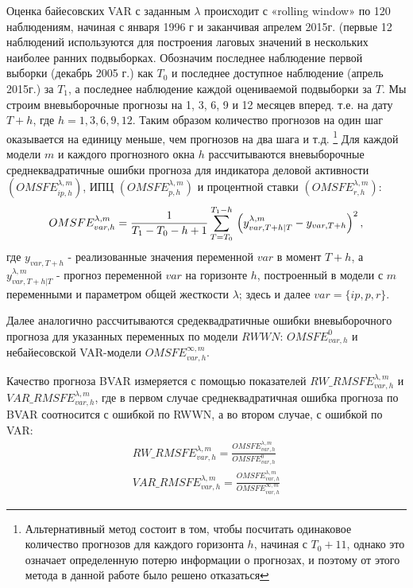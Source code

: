 \documentclass[11pt]{article} %
\begin{document}
	Оценка байесовских VAR с заданным $\lambda$ происходит с «rolling window» по 120 наблюдениям, начиная с января 1996 г и заканчивая апрелем 2015г. (первые 12 наблюдений используются для построения лаговых значений в нескольких наиболее ранних подвыборках. Обозначим последнее наблюдение первой выборки (декабрь 2005 г.) как $T_0$ и последнее доступное наблюдение (апрель 2015г.) за $T_1$, а последнее наблюдение каждой оцениваемой подвыборки за $T$. Мы строим вневыборочные прогнозы на 1, 3, 6, 9 и 12 месяцев вперед.   т.е. на дату $T+h$, где $h=1,3,6,9, 12$. Таким образом количество прогнозов на один шаг оказывается на единицу меньше, чем прогнозов на два шага и т.д. \footnote{Альтернативный метод состоит в том, чтобы посчитать одинаковое количество прогнозов для каждого горизонта $h$, начиная с $T_0+11$, однако это означает определенную потерю информации о прогнозах, и поэтому от этого метода в данной работе было решено отказаться}
Для каждой модели $m$  и каждого прогнозного окна $h$ рассчитываются вневыборочные среднеквадратичные  ошибки прогноза для индикатора деловой активности $(OMSFE_{ip,h}^{\lambda,m})$, ИПЦ $(OMSFE_{p,h}^{\lambda,m})$ и процентной ставки $(OMSFE_{r,h}^{\lambda,m})$:
\begin{equation}
OMSFE_{var,h}^{\lambda,m}=\frac{1}{T_1-T_0-h+1}\sum_{T=T_0}^{T_1-h} \\\left(y_{var,T+h|T}^{\lambda,m}-y_{var,T+h}\right)^2,
\end{equation}
где $y_{var,T+h}$ - реализованные значения переменной $var$ в момент $T+h$, а $y_{var,T+h|T}^{\lambda,m}$ - прогноз переменной $var$ на горизонте $h$, построенный в модели с $m$ переменными и параметром общей жесткости $\lambda$; здесь и далее $var=\lbrace{ip,p,r\rbrace}$.

	Далее аналогично рассчитываются средеквадратичные ошибки вневыборочного прогноза для указанных переменных по модели $RWWN$: $OMSFE_{var,h}^{0}$ и небайесовской VAR-модели $OMSFE_{var,h}^{\infty,m}$.
	 
	Качество прогноза BVAR измеряется с помощью показателей $RW\_RMSFE_{var,h}^{\lambda,m}$ и $VAR\_RMSFE_{var,h}^{\lambda,m}$, где в первом случае среднеквадратичная ошибка прогноза по BVAR соотносится с ошибкой по RWWN, а во втором случае, с ошибкой по VAR:
\begin{gather}
	RW\_RMSFE_{var,h}^{\lambda,m}=\frac{OMSFE_{var,h}^{\lambda,m}}{OMSFE_{var,h}^0}\\
	VAR\_RMSFE_{var,h}^{\lambda,m}=\frac{OMSFE_{var,h}^{\lambda,m}}{OMSFE_{var,h}^{\infty,m}}
\end{gather}
\end{document}
